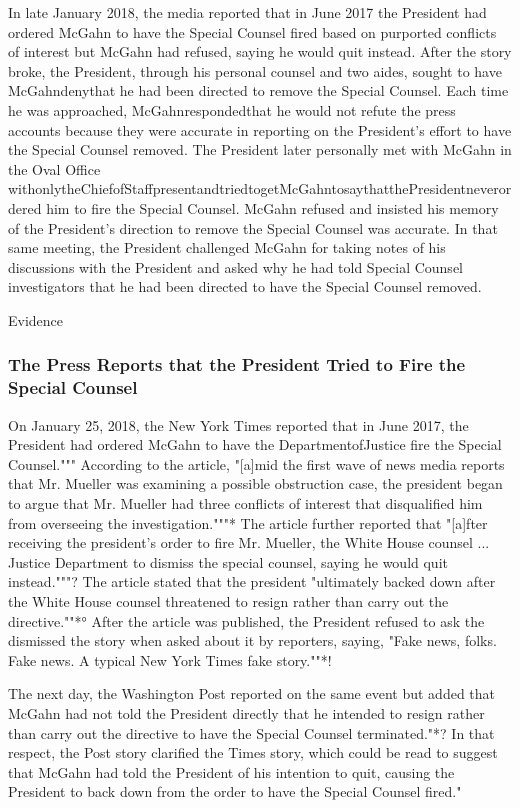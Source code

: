 In late January 2018, the media reported that in June 2017 the President had ordered McGahn to have the Special Counsel fired based on purported conflicts of interest but McGahn had refused, saying he would quit instead.
After the story broke, the President, through his personal counsel and two aides, sought to have McGahndenythat he had been directed to remove the Special Counsel.
Each time he was approached, McGahnrespondedthat he would not refute the press accounts because they were accurate in reporting on the President's effort to have the Special Counsel removed.
The President later personally met with McGahn in the Oval Office withonlytheChiefofStaffpresentandtriedtogetMcGahntosaythatthePresidentneverordered him to fire the Special Counsel.
McGahn refused and insisted his memory of the President's direction to remove the Special Counsel was accurate.
In that same meeting, the President challenged McGahn for taking notes of his discussions with the President and asked why he had told Special Counsel investigators that he had been directed to have the Special Counsel removed.

Evidence

\subsubsection{The Press Reports that the President Tried to Fire the Special Counsel}

On January 25, 2018, the New York Times reported that in June 2017, the President had ordered McGahn to have the DepartmentofJustice fire the Special Counsel."""
According to the article, "[a]mid the first wave of news media reports that Mr. Mueller was examining a possible obstruction case, the president began to argue that Mr. Mueller had three conflicts of interest that disqualified him from overseeing the investigation."""*
The article further reported that "[a]fter
receiving the president's order to fire Mr. Mueller, the White House counsel ...
Justice Department to dismiss the special counsel, saying he would quit instead."""?
The article stated that the president "ultimately backed down after the White House counsel threatened to resign rather than carry out the directive.""*°
After the article was published, the President
refused to ask the
dismissed the story when asked about it by reporters, saying, "Fake news, folks.
Fake news.
A typical New York Times fake story.""*!

The next day, the Washington Post reported on the same event but added that McGahn had not told the President directly that he intended to resign rather than carry out the directive to have the Special Counsel terminated."*?
In that respect, the Post story clarified the Times story, which could be read to suggest that McGahn had told the President of his intention to quit, causing the President to back down from the order to have the Special Counsel fired."

